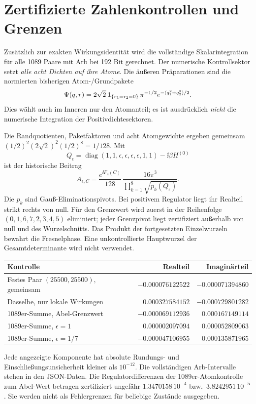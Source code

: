 \documentclass[10pt,a4paper]{article}
\begin{document}
\section{Zertifizierte Zahlenkontrollen und Grenzen}
Zusätzlich zur exakten Wirkungsidentität wird die vollständige Skalarintegration
für alle 1089 Paare mit Arb bei 192 Bit gerechnet.
Der numerische Kontrollsektor setzt \emph{alle acht Dichten auf ihre Atome}.
Die äußeren Präparationen sind die normierten bisherigen Atom-/Grundpakete
\[
 \Psi(q,r)=2\sqrt2\,\mathbf1_{\{r_1=r_2=0\}}\,
 \pi^{-1/2}e^{-(q_1^2+q_2^2)/2}.
\]
Dies wählt auch im Inneren nur den Atomanteil; es ist ausdrücklich
\emph{nicht} die numerische Integration der Positivdichtesektoren.

Die Randquotienten, Paketfaktoren und acht Atomgewichte ergeben gemeinsam
$(1/2)^2(2\sqrt2)^2(1/2)^8=1/128$. Mit
\[
 Q_\epsilon=\operatorname{diag}(1,1,\epsilon,\epsilon,\epsilon,
 \epsilon,1,1)-\ii\beta H^{(0)}
\]
ist der historische Beitrag
\[
 A_{\epsilon,C}=\frac{e^{\ii F_4(C)}}{128}\,
 \frac{16\pi^3}{\prod_{k=1}^{8}\sqrt{p_k(Q_\epsilon)}}.       \tag{9}
\]
Die $p_k$ sind Gauß-Eliminationspivots. Bei positivem Regulator liegt ihr
Realteil strikt rechts von null. Für den Grenzwert wird zuerst in der
Reihenfolge $(0,1,6,7,2,3,4,5)$ eliminiert; jeder Grenzpivot liegt
zertifiziert außerhalb von null und des Wurzelschnitts.
Das Produkt der fortgesetzten Einzelwurzeln bewahrt die Fresnelphase.
Eine unkontrollierte Hauptwurzel der Gesamtdeterminante wird nicht verwendet.

\begin{center}\begin{tabular}{p{.43\linewidth}rr}\toprule
Kontrolle & Realteil & Imaginärteil\\\midrule
Festes Paar $(25500,25500)$, gemeinsam
 & $-0.000076122522$ & $-0.000071394860$\\
Dasselbe, nur lokale Wirkungen
 & $ 0.000327584152$ & $-0.000729801282$\\
1089er-Summe, Abel-Grenzwert
 & $-0.000069112936$ & $ 0.000167149114$\\
1089er-Summe, $\epsilon=1$
 & $ 0.000002097094$ & $ 0.000052809063$\\
1089er-Summe, $\epsilon=1/7$
 & $-0.000047106955$ & $ 0.000135871965$\\\bottomrule
\end{tabular}\end{center}
Jede angezeigte Komponente hat absolute Rundungs- und Einschließungsunsicherheit
kleiner als $10^{-12}$. Die vollständigen Arb-Intervalle stehen in den JSON-Daten.
Die Regulatordifferenzen der 1089er-Atomkontrolle zum Abel-Wert betragen
zertifiziert ungefähr $1.3470158\,10^{-4}$ bzw.\ $3.8242951\,10^{-5}$.
Sie werden nicht als Fehlergrenzen für beliebige Zustände ausgegeben.
\end{document}

